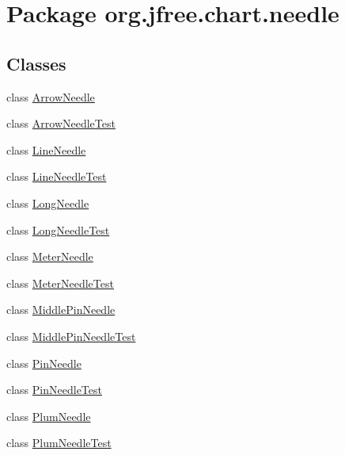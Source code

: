 \hypertarget{namespaceorg_1_1jfree_1_1chart_1_1needle}{}\section{Package org.\+jfree.\+chart.\+needle}
\label{namespaceorg_1_1jfree_1_1chart_1_1needle}
\subsection*{Classes}
\begin{DoxyCompactItemize}
\item 
class \mbox{\hyperlink{classorg_1_1jfree_1_1chart_1_1needle_1_1_arrow_needle}{Arrow\+Needle}}
\item 
class \mbox{\hyperlink{classorg_1_1jfree_1_1chart_1_1needle_1_1_arrow_needle_test}{Arrow\+Needle\+Test}}
\item 
class \mbox{\hyperlink{classorg_1_1jfree_1_1chart_1_1needle_1_1_line_needle}{Line\+Needle}}
\item 
class \mbox{\hyperlink{classorg_1_1jfree_1_1chart_1_1needle_1_1_line_needle_test}{Line\+Needle\+Test}}
\item 
class \mbox{\hyperlink{classorg_1_1jfree_1_1chart_1_1needle_1_1_long_needle}{Long\+Needle}}
\item 
class \mbox{\hyperlink{classorg_1_1jfree_1_1chart_1_1needle_1_1_long_needle_test}{Long\+Needle\+Test}}
\item 
class \mbox{\hyperlink{classorg_1_1jfree_1_1chart_1_1needle_1_1_meter_needle}{Meter\+Needle}}
\item 
class \mbox{\hyperlink{classorg_1_1jfree_1_1chart_1_1needle_1_1_meter_needle_test}{Meter\+Needle\+Test}}
\item 
class \mbox{\hyperlink{classorg_1_1jfree_1_1chart_1_1needle_1_1_middle_pin_needle}{Middle\+Pin\+Needle}}
\item 
class \mbox{\hyperlink{classorg_1_1jfree_1_1chart_1_1needle_1_1_middle_pin_needle_test}{Middle\+Pin\+Needle\+Test}}
\item 
class \mbox{\hyperlink{classorg_1_1jfree_1_1chart_1_1needle_1_1_pin_needle}{Pin\+Needle}}
\item 
class \mbox{\hyperlink{classorg_1_1jfree_1_1chart_1_1needle_1_1_pin_needle_test}{Pin\+Needle\+Test}}
\item 
class \mbox{\hyperlink{classorg_1_1jfree_1_1chart_1_1needle_1_1_plum_needle}{Plum\+Needle}}
\item 
class \mbox{\hyperlink{classorg_1_1jfree_1_1chart_1_1needle_1_1_plum_needle_test}{Plum\+Needle\+Test}}

\end{DoxyCompactItemize}
